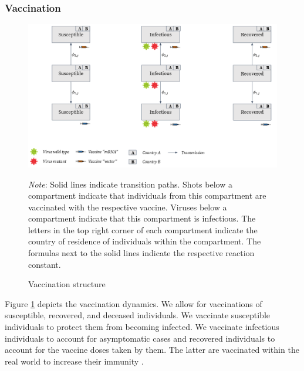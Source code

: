 \subsubsection{Vaccination}
\begin{figure}[h!]
\centering
\includegraphics[scale=0.3]{images/overview_vaccination.png}\\
\begin{flushleft}
\scriptsize{\textit{Note}: Solid lines indicate transition paths. Shots below a compartment indicate that individuals from this compartment are vaccinated with the respective vaccine. Viruses below a compartment indicate that this compartment is infectious. The letters in the top right corner of each compartment indicate the country of residence of individuals within the compartment. The formulas next to the solid lines indicate the respective reaction constant.}
\end{flushleft}
\caption{Vaccination structure}
\label{fig:model_vaccination_ov}
\end{figure}
Figure \ref{fig:model_vaccination_ov} depicts the vaccination dynamics. We allow for vaccinations of susceptible, recovered, and deceased individuals. We vaccinate susceptible individuals to protect them from becoming infected. We vaccinate infectious individuals to account for asymptomatic cases \citep{Byambasuren.2020} and recovered individuals to account for the vaccine doses taken by them. The latter are vaccinated within the real world to increase their immunity \citep{Skelly.2021}. \\

